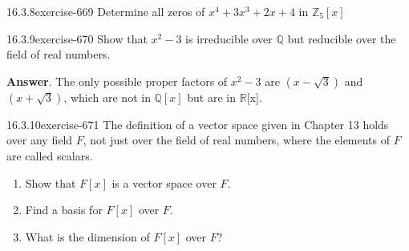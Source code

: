 \documentclass[twoside,10pt,]{book}
\numberwithin{equation}{section}
\begin{document}
\begin{divisionsolution}{16.3.8}{}{exercise-669}%
\hypertarget{p-5999}{}%
Determine all zeros of \(x^4+ 3x^3 + 2x + 4\) in \(\mathbb{Z}_5[x]\)%
\end{divisionsolution}%
\begin{divisionsolution}{16.3.9}{}{exercise-670}%
\hypertarget{p-6000}{}%
Show that \(x^2 - 3\) is irreducible over \(\mathbb{Q}\) but reducible over the field of real numbers.%
\par\smallskip%
\noindent\textbf{Answer}.\quad%
\hypertarget{p-6001}{}%
The only possible proper factors of \(x^2- 3\) are \(\left(x - \sqrt{3}\right)\) and \(\left(x+\sqrt{3}\right)\), which are not in \(\mathbb{Q}[x]\) but are in \(\mathbb{R}\)[x].%
\end{divisionsolution}%
\begin{divisionsolution}{16.3.10}{}{exercise-671}%
\hypertarget{p-6002}{}%
The definition of a vector space given in Chapter 13 holds over any field \(F\), not just over the field of real numbers, where the elements of \(F\) are called scalars.\leavevmode%
\begin{enumerate}[label=(\alph*)]
\item\hypertarget{li-2657}{}\hypertarget{p-6003}{}%
Show that \(F[x]\) is a vector space over \(F\).%
\item\hypertarget{li-2658}{}\hypertarget{p-6004}{}%
Find a basis for \(F[x]\) over \(F\).%
\item\hypertarget{li-2659}{}\hypertarget{p-6005}{}%
What is the dimension of \(F[x]\) over \(F\)?%
\end{enumerate}
%
\end{divisionsolution}%
\end{document}
